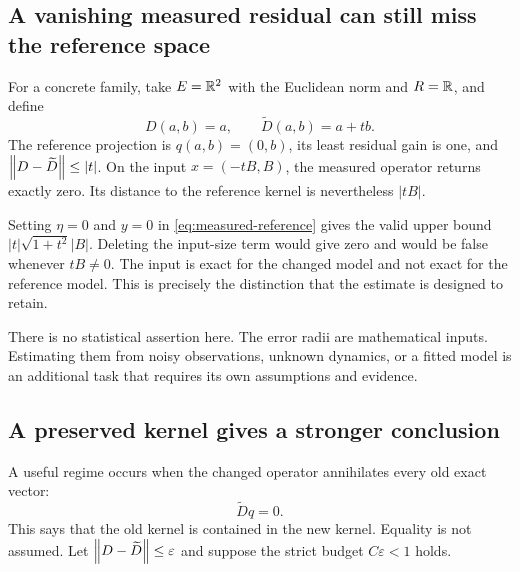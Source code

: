\subsection{A vanishing measured residual can still miss the reference space}
For a concrete family, take \(E=\mathbb R^2\) with the Euclidean norm and \(R=\mathbb R\), and define
\[
 D(a,b)=a,\qquad \widetilde D(a,b)=a+tb.
\]
The reference projection is \(q(a,b)=(0,b)\), its least residual gain is one, and \(\left\lVert D-\widetilde D\right\rVert\le|t|\). On the input \(x=(-tB,B)\), the measured operator returns exactly zero. Its distance to the reference kernel is nevertheless \(|tB|\).

Setting \(\eta=0\) and \(y=0\) in \eqref{eq:measured-reference} gives the valid upper bound \(|t|\sqrt{1+t^2}|B|\). Deleting the input-size term would give zero and would be false whenever \(tB\ne0\). The input is exact for the changed model and not exact for the reference model. This is precisely the distinction that the estimate is designed to retain.

There is no statistical assertion here. The error radii are mathematical inputs. Estimating them from noisy observations, unknown dynamics, or a fitted model is an additional task that requires its own assumptions and evidence.

\subsection{A preserved kernel gives a stronger conclusion}
A useful regime occurs when the changed operator annihilates every old exact vector:
\[
 \widetilde D q=0.
\]
This says that the old kernel is contained in the new kernel. Equality is not assumed. Let \(\left\lVert D-\widetilde D\right\rVert\le\varepsilon\) and suppose the strict budget \(C\varepsilon<1\) holds.

